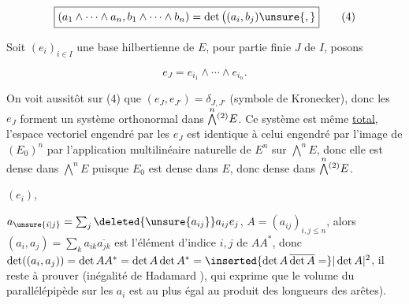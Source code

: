 \[
\boxed{(a_1\wedge\cdots\wedge a_n,b_1\wedge\cdots\wedge b_n)=\det\big((a_i,b_j)\unsure{,}\big.} \tag*{(4)}
\]

Soit $(e_i)_{i\in I}$ une base hilbertienne  de  $E$, pour  partie
finie   $J$ de $I$, posons

\[
\boxed{e_J=e_{i_1}\wedge\cdots\wedge e_{i_n}}. \tag*{(5)}
\]

 On voit aussitôt sur (4) que
$(e_J,e_{J'})=\delta_{J,J'}$ (symbole de Kronecker), donc les
$e_J$ forment un système orthonormal dans $\overset{n}{\bigwedge}\vphantom{\bigwedge}^{(2)}E$. Ce système
est  même \uline{total},   l'espace vectoriel engendré
par les $e_J$  est identique à celui engendré par l'image
de $(E_0)^n$ par l'application multilinéaire naturelle de $E^n$
 sur $\overset{n}{\bigwedge}E$, donc elle est dense dans $\overset{n}{\bigwedge}E$ puisque
$E_0$ est dense dans $E$, donc dense dans $\overset{n}{\bigwedge}\vphantom{\bigwedge}^{(2)}E$.


 $(e_i)$, 

  $a_{\unsure{i|j}}=\sum_j\deleted{\unsure{a_{ij}}}a_{ij}e_j$,
 $A=(a_{ij})_{i,j\leq n}$, alors $(a_i,a_j)=\sum_k a_{ik}\overline{a_{jk}}$
est l'élément d'indice $i,j$ de  $AA^*$, donc
$\det((a_i,a_j))=\det AA^*=\det A\det A^*=\inserted{\det A\,\overline{\det A}=}|\det A|^2$,  il
reste à prouver  (inégalité
de Hadamard \unsure{!}), qui exprime que le volume du
parallélépipède  sur les $a_i$ est au plus
égal au produit des longueurs des arêtes).

